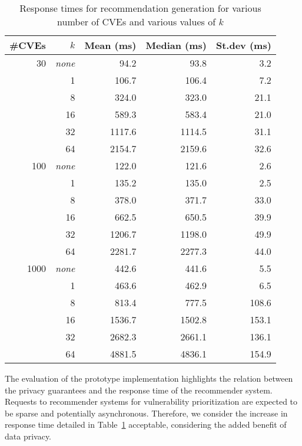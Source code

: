 {\begin{table}[ht]
    \centering
    \caption{Response times for recommendation generation for various number of CVEs and various values of $k$}
    \begin{tabular}{rrrrr}
        \toprule
        \#CVEs & $k$ & Mean (ms) & Median (ms) & St.dev (ms) \\
        \midrule
        30 & \emph{none} &   94.2 &   93.8 &   3.2 \\
           & 1           &  106.7 &  106.4 &   7.2 \\
           & 8           &  324.0 &  323.0 &  21.1 \\
           & 16          &  589.3 &  583.4 &  21.0 \\
           & 32          & 1117.6 & 1114.5 &  31.1 \\
           & 64          & 2154.7 & 2159.6 &  32.6 \\
        \midrule
        100 & \emph{none} &  122.0 &  121.6 &    2.6 \\
            & 1           &  135.2 &  135.0 &    2.5 \\
            & 8           &  378.0 &  371.7 &   33.0 \\
            & 16          &  662.5 &  650.5 &   39.9 \\
            & 32          & 1206.7 & 1198.0 &   49.9 \\
            & 64          & 2281.7 & 2277.3 &   44.0 \\
        \midrule
        1000 & \emph{none} &  442.6 &  441.6 &    5.5 \\
             & 1           &  463.6 &  462.9 &    6.5 \\
             & 8           &  813.4 &  777.5 &  108.6 \\
             & 16          & 1536.7 & 1502.8 &  153.1 \\
             & 32          & 2682.3 & 2661.1 &  136.1 \\
             & 64          & 4881.5 & 4836.1 &  154.9 \\
        \bottomrule
    \end{tabular}
    \label{tbl:evaluation}
\end{table}

The evaluation of the prototype implementation highlights the relation between the privacy guarantees and the response time of the recommender system.
Requests to recommender systems for vulnerability prioritization are expected to be sparse and potentially asynchronous.
Therefore, we consider the increase in response time detailed in Table~\ref{tbl:evaluation}  acceptable, considering the added benefit of data privacy.

}
